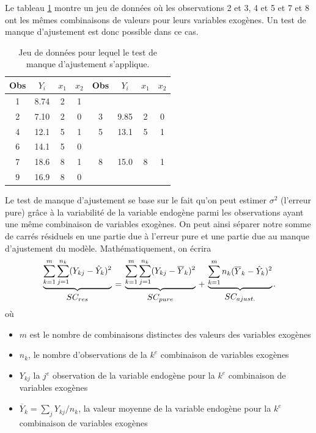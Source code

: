 \begin{exemple}
\label{lof1}
Le tableau \ref{jeuLOF} montre un jeu de données où les observations 2 et 3, 4 et 5 et 7 et 8 ont les m\^emes combinaisons de valeurs pour leurs variables exogènes. Un test de manque d'ajustement est donc possible dans ce cas.

\begin{table}[H]
\begin{center}
\begin{tabular}{||cccc||cccc||}\hline\hline
Obs & $Y_i$ & $x_{1}$ & $x_{2}$ & Obs & $Y_i$ & $x_{1}$
& $x_{2}$ \\ \hline\hline
 1 &  8.74 & 2 & 1 &&&& \\
 2 & 7.10 & 2 & 0 & 3 & 9.85 & 2 & 0 \\ 4 & 12.1 & 5 & 1 & 5 & 13.1 & 5 & 1 \\
 6 & 14.1 & 5 & 0 &&&& \\
 7 & 18.6 & 8 & 1 & 8 & 15.0 & 8 & 1 \\
 9 & 16.9 & 8 & 0 &&&& \\
\hline\hline
\end{tabular}\end{center}
\caption{Jeu de données pour lequel le test de manque d'ajustement s'applique.}
\label{jeuLOF}
\end{table}
\end{exemple}

Le test de manque d'ajustement se base sur le fait qu'on peut estimer $\sigma^2$ (l'erreur pure) gr\^ace à la variabilité de la variable endogène parmi les observations ayant une m\^eme combinaison de variables exogènes. On peut ainsi séparer notre somme de carrés résiduels en une partie due à l'erreur pure et une partie due au manque d'ajustement du modèle. Mathématiquement, on écrira
$$
{\underbrace{\sum_{k=1}^m\sum_{j=1}^{n_k}(Y_{kj}-\hat{Y}_k)^2}\atop
SC_{res}}={\underbrace{\sum_{k=1}^m\sum_{j=1}^{n_k}(Y_{kj}-\overline{Y}_k)^2}
\atop
SC_{pure}}+{\underbrace{\sum_{k=1}^mn_k(\overline{Y}_k-\hat{Y}_k)^2}
\atop SC_{ajust.}}.$$
o\`u
\begin{itemize}
\item[$\bullet$] $m$ est le nombre de combinaisons distinctes des valeurs des variables exogènes
\item[$\bullet$] $n_k$, le nombre d'observations de la $k^e$ combinaison de variables exogènes
\item[$\bullet$] $Y_{kj}$ la $j^e$ observation de la variable endogène pour la $k^e$ combinaison de variables exogènes
\item[$\bullet$] $\overline{Y}_k=\sum_jY_{kj}/{n_k}$, la valeur moyenne de la variable
endogène pour la $k^e$ combinaison de variables exogènes
\end{itemize}



